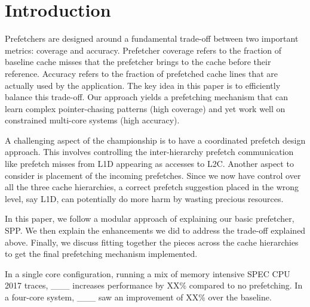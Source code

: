 \section{Introduction}
\label{Introduction}

Prefetchers are designed around a fundamental trade-off between two important
metrics: coverage and accuracy. Prefetcher coverage refers to the fraction of
baseline cache misses that the prefetcher brings to the cache before their
reference. Accuracy refers to the fraction of prefetched cache lines that are
actually used by the application. The key idea in this paper is to efficiently
balance this trade-off. Our approach yields a prefetching mechanism that can
learn complex pointer-chasing patterns (high coverage) and yet work well on
constrained multi-core systems (high accuracy).

A challenging aspect of the championship is to have a coordinated 
prefetch design approach. This involves controlling the inter-hierarchy 
prefetch communication like prefetch misses from L1D appearing as accesses 
to L2C. Another aspect to consider is placement of the incoming prefetches.
Since we now have control over all the three cache hierarchies, a correct 
prefetch suggestion placed in the wrong level, say L1D, can potentially 
do more harm by wasting precious resources.

In this paper, we follow a modular approach of explaining our basic
prefetcher, SPP. We then explain the enhancements we did to address the
trade-off explained above. Finally, we discuss fitting together the pieces
across the cache hierarchies to get the final prefetching mechanism
implemented.

In a single core configuration, running a mix of memory intensive SPEC CPU 
2017 traces, \_\_\_ increases performance by XX\% compared to no prefetching. 
In a four-core system, \_\_\_ saw an improvement of XX\% over the baseline.

